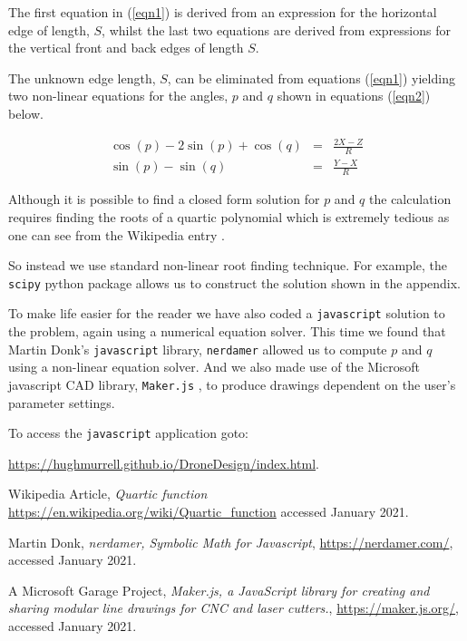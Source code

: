 \documentclass[11pt]{article}
\begin{document}
The first equation in (\ref{eqn1}) is derived from an expression for the horizontal edge of length, $S$,
whilst the last two equations are derived from expressions for the vertical front and back edges of length $S$.

The unknown edge length, $S$, can be eliminated from equations (\ref{eqn1}) yielding two non-linear
equations for the angles, $p$ and $q$ shown in equations (\ref{eqn2}) below.

\begin{eqnarray}
\cos(p) - 2 \sin(p) + \cos(q) & = & \frac{2X-Z}{R} \nonumber \\
\sin(p) - \sin(q) & = & \frac{Y-X}{R}   \label{eqn2} 
\end{eqnarray}

Although it is possible to find a closed form solution for $p$ and $q$ the calculation 
requires finding the roots of a quartic polynomial which is extremely tedious as one
can see from the Wikipedia entry \cite{quartic}.

So instead we use standard non-linear root finding technique. For example,
the {\tt scipy} python package allows us to construct the solution shown in the appendix.

To make life easier for the reader we have also coded a {\tt javascript} solution to the
problem, again using a numerical equation solver. This time we found that Martin Donk's 
{\tt javascript} library, {\tt nerdamer} \cite{donk} allowed us to compute $p$ and $q$ using
a non-linear equation solver. And we also made use of the Microsoft javascript CAD library,
{\tt Maker.js} \cite{maker}, to produce drawings dependent on the user's parameter settings. 

To access the {\tt javascript} application goto:

\url{https://hughmurrell.github.io/DroneDesign/index.html}.


\newpage
\begin{thebibliography}{99}


 Wikipedia Article,
{\em Quartic function} 
\url{https://en.wikipedia.org/wiki/Quartic_function}
accessed January 2021.

 Martin Donk,
{\em nerdamer, Symbolic Math for Javascript},
\url{https://nerdamer.com/},
accessed January 2021.

 A Microsoft Garage Project,
{\em Maker.js, a JavaScript library for creating and sharing modular line drawings for CNC and laser cutters.},
\url{https://maker.js.org/},
accessed January 2021.

\end{thebibliography}
\end{document}
